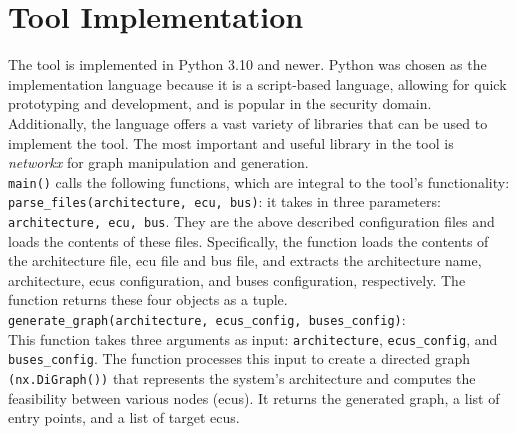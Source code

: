\section{Tool Implementation}
\label{sec:implementation}

The tool is implemented in Python 3.10 and newer.
Python was chosen as the implementation language because it is a script-based language, allowing for quick prototyping and development,
and is popular in the security domain.
Additionally, the language offers a vast variety of libraries that can be used to implement the tool.
The most important and useful library in the tool is \textit{networkx} for graph manipulation and generation.\\

\texttt{main()} calls the following functions, which are integral to the tool's functionality:\\

\texttt{parse\_files(architecture, ecu, bus)}: it takes in three parameters: \texttt{architecture, ecu, bus}.
They are the above described configuration files and loads the contents of these files. 
Specifically, the function loads the contents of the architecture file, \acrshort{ecu} file and bus file, 
and extracts the architecture name, architecture, \acrshort{ecu}s configuration, and buses configuration, respectively. 
The function returns these four objects as a tuple.\\

\texttt{generate\_graph(architecture, ecus\_config, buses\_config)}:\\
This function takes three arguments as input: 
\texttt{architecture}, \texttt{ecus\_config}, and \texttt{buses\_config}. 
The function processes this input to create a directed graph \texttt{(nx.DiGraph())} 
that represents the system's architecture and computes the feasibility between various nodes (\acrshort{ecu}s). 
It returns the generated graph, a list of entry points, and a list of target \acrshort{ecu}s.

